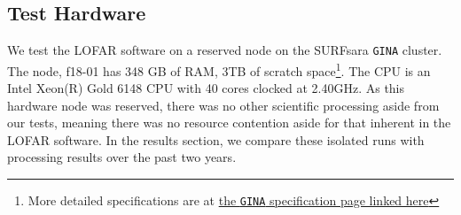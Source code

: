 \subsection{Test Hardware}\label{sec:ch6_hardware}

We test the LOFAR software on a reserved node on the SURFsara \texttt{GINA} cluster. The node, f18-01 has 348 GB of RAM, 3TB of scratch space\footnote{More detailed specifications are at \href{http://docs.surfsaralabs.nl/projects/grid/en/latest/Pages/Service/system_specifications/gina_specs.html}{the \texttt{GINA} specification page linked here}}. The CPU is an Intel Xeon(R) Gold 6148 CPU with 40 cores clocked at 2.40GHz.  As this hardware node was reserved, there was no other scientific processing aside from our tests, meaning there was no resource contention aside for that inherent in the LOFAR software. In the results section, we compare these isolated runs with processing results over the past two years. 
